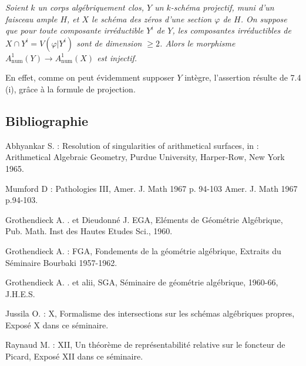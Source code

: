 \emph{Soient $k$ un corps alg\'ebriquement clos, $Y$ un $k$-sch\'ema projectif, muni d'un faisceau ample $H$, et $X$ le sch\'ema des z\'eros d'une section $\varphi$ de $H$. On suppose que pour toute composante irr\'eductible $Y^i$ de $Y$, les composantes irr\'eductibles de $X\cap Y^i=V(\varphi|Y^i)$ sont de dimension $\geq2$. Alors le morphisme $A^1_{\mathrm{num}}(Y)\longrightarrow A^1_{\mathrm{num}}(X)$ est injectif.}

En effet, comme on peut \'evidemment supposer $Y$ int\`egre, l'assertion r\'esulte de 7.4 (i), gr\^ace \`a la formule de projection.

\subsection*{Bibliographie}
\begin{enumerate}[label={[\arabic*]}]
\item Abhyankar S. : Resolution of singularities of arithmetical surfaces, in : Arithmetical Algebraic Geometry, Purdue University, Harper-Row, New York 1965.
\item Mumford D : Pathologies III, Amer. J. Math 1967 p. 94-103 Amer. J. Math 1967 p.94-103.
\item Grothendieck A. . et Dieudonn\'e J. EGA, El\'ements de G\'eom\'etrie Alg\'ebrique, Pub. Math. Inst des Hautes Etudes Sci., 1960.
\item Grothendieck A. : FGA, Fondements de la g\'eom\'etrie alg\'ebrique, Extraits du S\'eminaire Bourbaki 1957-1962.
\item Grothendieck A. . et alii, SGA, S\'eminaire de g\'eom\'etrie alg\'ebrique, 1960-66, J.H.E.S.
\item Jussila O. : X, Formalisme des intersections sur les sch\'emas alg\'ebriques propres, Expos\'e X dans ce s\'eminaire.
\item Raynaud M. : XII, Un th\'eor\`eme de repr\'esentabilit\'e relative sur le foncteur de Picard, Expos\'e XII dans ce s\'eminaire.
\end{enumerate}



\providecommand{\Kb}{K^\bullet}
\providecommand{\Db}{D}
\providecommand{\Gtop}{\operatorname{Gr}_{\mathrm{top}}}
\providecommand{\Ftop}{\operatorname{Fil}_{\mathrm{top}}}


